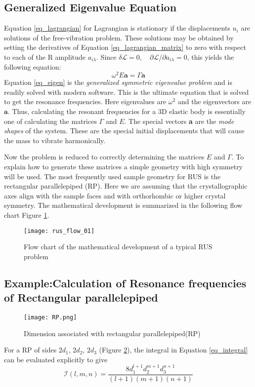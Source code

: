 \begin{doublespacing}
\subsection{Generalized Eigenvalue Equation}
Equation \ref{eq_lagrangian} for Lagrangian is stationary if the displacements $u_i$ are solutions of the free-vibration problem. These solutions may be obtained by setting the derivatives of Equation \ref{eq_lagrangian_matrix} to zero with respect to each of the R amplitude  $a_{i \lambda}$. Since $\delta \mathcal{L}=0,\quad \partial \mathcal{L}/ \partial{a_{i\lambda}} = 0$, this yields the following equation: 
\begin{equation}
\label{eq_eigen}
\omega^2 E \textbf{a} =  \Gamma \textbf{a}
\end{equation}
Equation \ref{eq_eigen} is the \textit{generalized symmetric eigenvalue problem} and is readily solved with modern software. This is the ultimate equation that is solved to get the resonance frequencies. Here eigenvalues are $\omega^2$ and the eigenvectors are $\textbf{a}$. Thus, calculating the resonant frequencies for a 3D elastic body is essentially one of calculating the matrices $\Gamma$ and $E$. The special vectors \textbf{a} are the \textit{mode shapes} of the system. These are the special initial displacements that will cause the mass to vibrate harmonically.

Now the problem is reduced to correctly determining the matrices $E$ and $\Gamma$. To explain how to generate these matrices a simple geometry with high symmetry will be used. The most frequently used sample geometry for RUS is the rectangular parallelepiped (RP). Here we are assuming that the crystallographic axes align with the sample faces and with orthorhombic or higher crystal symmetry. The mathematical development is summarized in the following flow chart Figure \ref{fig_rus_flow}.\\[1.5cm]
\begin{figure}[H]
\centering
\texttt{[image: rus\_flow\_01]}
\caption{Flow chart of the mathematical development of a typical RUS problem}
\label{fig_rus_flow}
\end{figure}






\subsection{Example:Calculation of Resonance frequencies of Rectangular parallelepiped}
\begin{figure}[H]
\centering
\texttt{[image: RP.png]}
\caption{Dimension associated with rectangular parallelepiped(RP)}
\label{fig_RP}
\end{figure}
For a RP of sides $2d_1$, $2d_2$, $2d_3$ (Figure \ref{fig_RP}), the integral in Equation \ref{eq_integral} can be evaluated explicitly to give
\begin{equation}
\label{eq_rpintegral}
\mathcal{I}(l,m,n) = \frac{8d_1^{l+1}d_2^{m+1}d_3^{n+1}}{(l+1)(m+1)(n+1)}
\end{equation}


\end{doublespacing}
